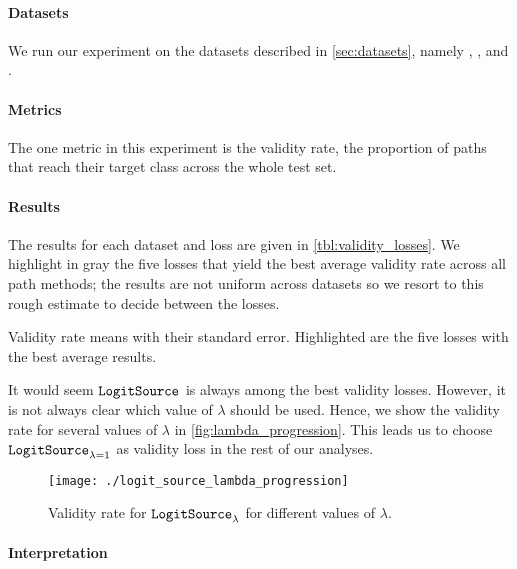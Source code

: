 \documentclass[../main.tex]{subfiles}
\begin{document}
\paragraph{Datasets}

We run our experiment on the datasets described in \autoref{sec:datasets}, namely \CakeOnSea, \ForestCover, \WineQuality{} and \OnlineNewsPopularity.

\paragraph{Metrics}

The one metric in this experiment is the validity rate, \ie{} the proportion of paths that reach their target class across the whole test set.

\paragraph{Results}

The results for each dataset and loss are given in \autoref{tbl:validity_losses}.
We highlight in gray the five losses that yield the best average validity rate across all path methods; the results are not uniform across datasets so we resort to this rough estimate to decide between the losses.

\begin{table}[h!]
\centering

\caption{Validity rate means with their standard error. Highlighted are the five losses with the best average results.}
\label{tbl:validity_losses}
\end{table}

It would seem $\mathtt{LogitSource}_{}$ is always among the best validity losses. However, it is not always clear which value of $\lambda$ should be used.
Hence, we show the validity rate for several values of $\lambda$ in \autoref{fig:lambda_progression}.
This leads us to choose $\mathtt{LogitSource}_{\lambda=1}$ as validity loss in the rest of our analyses.

\begin{figure}[htbp]
    \centering
    \texttt{[image: ./logit\_source\_lambda\_progression]}

    \caption{Validity rate for $\mathtt{LogitSource}_{\lambda}$ for different values of $\lambda$.}
    \label{fig:lambda_progression}
\end{figure}

\paragraph{Interpretation}
\end{document}
